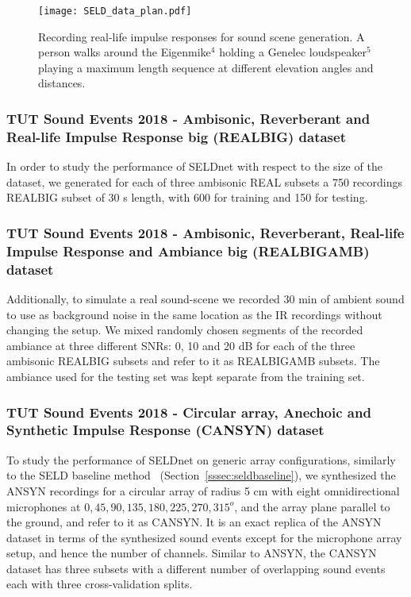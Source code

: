 \documentclass[journal]{IEEEtran}
\begin{document}
\begin{figure}[t]
  \centering
  \centerline{\texttt{[image: SELD\_data\_plan.pdf]}}
  \caption{Recording real-life impulse responses for sound scene generation. A person walks around the Eigenmike$^4$ holding a Genelec loudspeaker$^5$ playing a maximum length sequence at different elevation angles and distances.}
  \label{fig:seld_recording}
\end{figure}

\subsubsection{TUT Sound Events 2018 - Ambisonic, Reverberant and Real-life Impulse Response big (REALBIG) dataset} 
In order to study the performance of SELDnet with respect to the size of the dataset, we generated for each of three ambisonic REAL subsets a 750 recordings REALBIG subset of 30 s length, with 600 for training and 150 for testing. 

\subsubsection{TUT Sound Events 2018 - Ambisonic, Reverberant, Real-life Impulse Response and Ambiance big (REALBIGAMB) dataset} \label{sssec:realbigamb}
Additionally, to simulate a real sound-scene we recorded 30 min of ambient sound to use as background noise in the same location as the IR recordings without changing the setup. We mixed randomly chosen segments of the recorded ambiance at three different SNRs: 0, 10 and 20 dB for each of the three ambisonic REALBIG subsets and refer to it as REALBIGAMB subsets. The ambiance used for the testing set was kept separate from the training set.

\subsubsection{TUT Sound Events 2018 - Circular array, Anechoic and Synthetic Impulse Response (CANSYN) dataset} 
To study the performance of SELDnet on generic array configurations, similarly to the SELD baseline method~\cite{Hirvonen2015} (Section~\ref{sssec:seldbaseline}), we synthesized the ANSYN recordings for a circular array of radius 5 cm with eight omnidirectional microphones at $0, 45, 90, 135, 180, 225, 270, 315^o$, and the array plane parallel to the ground, and refer to it as CANSYN. It is an exact replica of the ANSYN dataset in terms of the synthesized sound events except for the microphone array setup, and hence the number of channels. Similar to ANSYN, the CANSYN dataset has three subsets with a different number of overlapping sound events each with three cross-validation splits. 
\end{document}
